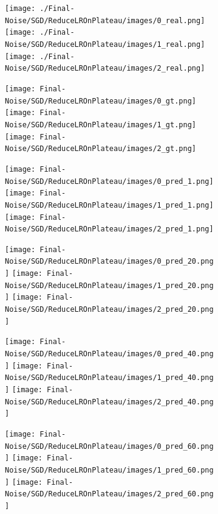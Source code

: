 \documentclass{article}
\begin{document}
\begin{figure}[h]
  \centering
  \begin{subfigure}[c]{0.12\textwidth}
    \centering
      \texttt{[image: ./Final-Noise/SGD/ReduceLROnPlateau/images/0\_real.png]}
      \texttt{[image: ./Final-Noise/SGD/ReduceLROnPlateau/images/1\_real.png]}
      \texttt{[image: ./Final-Noise/SGD/ReduceLROnPlateau/images/2\_real.png]}
  \end{subfigure}
  \begin{subfigure}[c]{0.12\textwidth}
    \centering
      \texttt{[image: Final-Noise/SGD/ReduceLROnPlateau/images/0\_gt.png]}
      \texttt{[image: Final-Noise/SGD/ReduceLROnPlateau/images/1\_gt.png]}
      \texttt{[image: Final-Noise/SGD/ReduceLROnPlateau/images/2\_gt.png]}
  \end{subfigure}
  \begin{subfigure}[c]{0.12\textwidth}
    \centering
      \texttt{[image: Final-Noise/SGD/ReduceLROnPlateau/images/0\_pred\_1.png]}
      \texttt{[image: Final-Noise/SGD/ReduceLROnPlateau/images/1\_pred\_1.png]}
      \texttt{[image: Final-Noise/SGD/ReduceLROnPlateau/images/2\_pred\_1.png]}
  \end{subfigure}
  \begin{subfigure}[c]{0.12\textwidth}
    \centering
      \texttt{[image: Final-Noise/SGD/ReduceLROnPlateau/images/0\_pred\_20.png]}
      \texttt{[image: Final-Noise/SGD/ReduceLROnPlateau/images/1\_pred\_20.png]}
      \texttt{[image: Final-Noise/SGD/ReduceLROnPlateau/images/2\_pred\_20.png]}
  \end{subfigure}
  \begin{subfigure}[c]{0.12\textwidth}
    \centering
      \texttt{[image: Final-Noise/SGD/ReduceLROnPlateau/images/0\_pred\_40.png]}
      \texttt{[image: Final-Noise/SGD/ReduceLROnPlateau/images/1\_pred\_40.png]}
      \texttt{[image: Final-Noise/SGD/ReduceLROnPlateau/images/2\_pred\_40.png]}
  \end{subfigure}
  \begin{subfigure}[c]{0.12\textwidth}
    \centering
      \texttt{[image: Final-Noise/SGD/ReduceLROnPlateau/images/0\_pred\_60.png]}
      \texttt{[image: Final-Noise/SGD/ReduceLROnPlateau/images/1\_pred\_60.png]}
      \texttt{[image: Final-Noise/SGD/ReduceLROnPlateau/images/2\_pred\_60.png]}
  \end{subfigure}

\end{figure}
\end{document}
